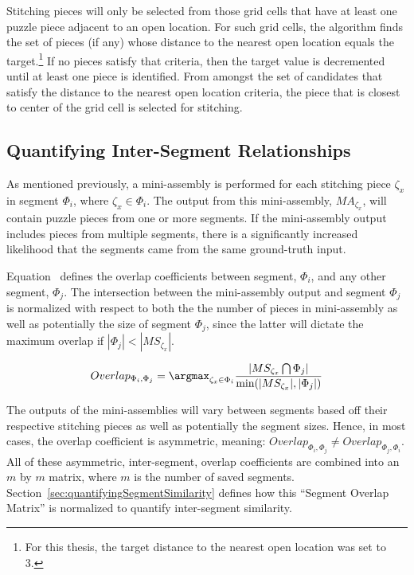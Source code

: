 Stitching pieces will only be selected from those grid cells that have at least one puzzle piece adjacent to an open location. For such grid cells, the algorithm finds the set of pieces (if any) whose distance to the nearest open location equals the target.\footnote{For this thesis, the target distance to the nearest open location was set to 3.}  If no pieces satisfy that criteria, then the target value is decremented until at least one piece is identified. From amongst the set of candidates that satisfy the distance to the nearest open location criteria, the piece that is closest to center of the grid cell is selected for stitching. 

\subsection{Quantifying Inter-Segment Relationships}

As mentioned previously, a mini-assembly is performed for each stitching piece $\zeta_x$ in segment $\Phi_i$, where $\zeta_x \in \Phi_i$.  The output from this mini-assembly, $MA_{\zeta_x}$, will contain puzzle pieces from one or more segments.  If the mini-assembly output includes pieces from multiple segments, there is a significantly increased likelihood that the segments came from the same ground-truth input. 

Equation~ defines the overlap coefficients between segment, $\Phi_i$, and any other segment, $\Phi_j$. The intersection between the mini-assembly output and segment $\Phi_j$ is normalized with respect to both the the number of pieces in mini-assembly as well as potentially the size of segment $\Phi_j$, since the latter will dictate the maximum overlap if $|\Phi_j| < |MS_{\zeta_x}|$.  

\begin{equation} \label{eq:segmentOverlap}
Overlap_{\Phi_i,\Phi_j} = \argmax_{\zeta_x \in \Phi_i} {\frac{|MS_{\zeta_x} \bigcap \Phi_j|}{\text{min}(|MS_{\zeta_x}|, |\Phi_j|)}}
\end{equation}

The outputs of the mini-assemblies will vary between segments based off their respective stitching pieces as well as potentially the segment sizes.  Hence, in most cases, the overlap coefficient is asymmetric, meaning: $Overlap_{\Phi_i,\Phi_j} \neq Overlap_{\Phi_j,\Phi_i}$.  All of these asymmetric, inter-segment, overlap coefficients are combined into an $m$ by $m$ matrix, where $m$ is the number of saved segments.  Section~\ref{sec:quantifyingSegmentSimilarity} defines how this ``Segment Overlap Matrix'' is normalized to quantify inter-segment similarity.  

